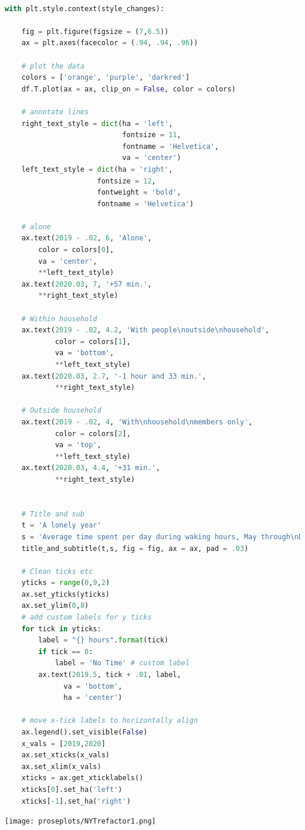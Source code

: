 \begin{lstlisting}[language = Python]

with plt.style.context(style_changes):
    
    fig = plt.figure(figsize = (7,6.5)) 
    ax = plt.axes(facecolor = (.94, .94, .96))

    # plot the data
    colors = ['orange', 'purple', 'darkred']
    df.T.plot(ax = ax, clip_on = False, color = colors)

    # annotate lines
    right_text_style = dict(ha = 'left', 
                            fontsize = 11, 
                            fontname = 'Helvetica',
                            va = 'center')
    left_text_style = dict(ha = 'right',
                      fontsize = 12,
                      fontweight = 'bold',
                      fontname = 'Helvetica')

    # alone
    ax.text(2019 - .02, 6, 'Alone', 
        color = colors[0], 
        va = 'center',
        **left_text_style)
    ax.text(2020.03, 7, '+57 min.', 
        **right_text_style)
    
    # Within household
    ax.text(2019 - .02, 4.2, 'With people\noutside\nhousehold', 
            color = colors[1], 
            va = 'bottom',
            **left_text_style)
    ax.text(2020.03, 2.7, '-1 hour and 33 min.',
            **right_text_style)

    # Outside household
    ax.text(2019 - .02, 4, 'With\nhousehold\nmembers only', 
            color = colors[2], 
            va = 'top',
            **left_text_style)
    ax.text(2020.03, 4.4, '+31 min.',
            **right_text_style)
    
    
    # Title and sub
    t = 'A lonely year'
    s = 'Average time spent per day during waking hours, May through\nDecember in 2020 vs. 2019'
    title_and_subtitle(t,s, fig = fig, ax = ax, pad = .03)
    
    # Clean ticks etc   
    yticks = range(0,9,2)
    ax.set_yticks(yticks)
    ax.set_ylim(0,8)
    # add custom labels for y ticks
    for tick in yticks:
        label = "{} hours".format(tick)
        if tick == 0:
            label = 'No Time' # custom label
        ax.text(2019.5, tick + .01, label,
              va = 'bottom',
              ha = 'center')
    
    # move x-tick labels to horizontally align
    ax.legend().set_visible(False)
    x_vals = [2019,2020]
    ax.set_xticks(x_vals)
    ax.set_xlim(x_vals)
    xticks = ax.get_xticklabels()
    xticks[0].set_ha('left')
    xticks[-1].set_ha('right')
\end{lstlisting}

\begin{center}
    \texttt{[image: proseplots/NYTrefactor1.png]}
\end{center}